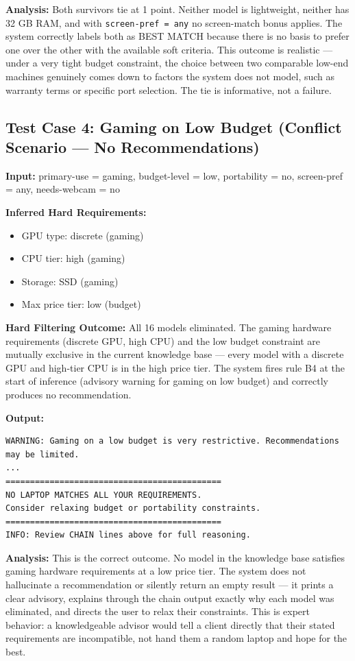 \documentclass[12pt,a4paper]{article}
\begin{document}
\textbf{Analysis:} Both survivors tie at 1 point. Neither model is lightweight, neither has 32 GB RAM, and with \texttt{screen-pref = any} no screen-match bonus applies. The system correctly labels both as BEST MATCH because there is no basis to prefer one over the other with the available soft criteria. This outcome is realistic --- under a very tight budget constraint, the choice between two comparable low-end machines genuinely comes down to factors the system does not model, such as warranty terms or specific port selection. The tie is informative, not a failure.

\subsection{Test Case 4: Gaming on Low Budget (Conflict Scenario --- No Recommendations)}

\textbf{Input:} primary-use = gaming, budget-level = low, portability = no, screen-pref = any, needs-webcam = no

\textbf{Inferred Hard Requirements:}
\begin{itemize}
    \item GPU type: discrete (gaming)
    \item CPU tier: high (gaming)
    \item Storage: SSD (gaming)
    \item Max price tier: low (budget)
\end{itemize}

\textbf{Hard Filtering Outcome:} All 16 models eliminated. The gaming hardware requirements (discrete GPU, high CPU) and the low budget constraint are mutually exclusive in the current knowledge base --- every model with a discrete GPU and high-tier CPU is in the high price tier. The system fires rule B4 at the start of inference (advisory warning for gaming on low budget) and correctly produces no recommendation.

\textbf{Output:}
\begin{lstlisting}[style=output]
WARNING: Gaming on a low budget is very restrictive. Recommendations may be limited.
...
============================================
NO LAPTOP MATCHES ALL YOUR REQUIREMENTS.
Consider relaxing budget or portability constraints.
============================================
INFO: Review CHAIN lines above for full reasoning.
\end{lstlisting}

\textbf{Analysis:} This is the correct outcome. No model in the knowledge base satisfies gaming hardware requirements at a low price tier. The system does not hallucinate a recommendation or silently return an empty result --- it prints a clear advisory, explains through the chain output exactly why each model was eliminated, and directs the user to relax their constraints. This is expert behavior: a knowledgeable advisor would tell a client directly that their stated requirements are incompatible, not hand them a random laptop and hope for the best.
\end{document}

